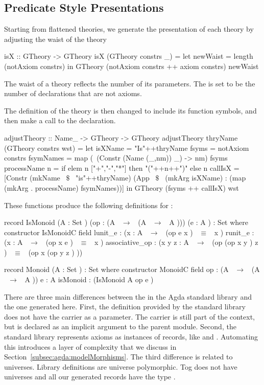 \subsection{Predicate Style Presentations}
Starting from flattened theories, we generate the  presentation of each theory by adjusting the waist of the theory
\begin{hscode}
isX :: GTheory -> GTheory
isX (GTheory constrs _) =
  let newWaist = length (notAxiom constrs) 
  in GTheory (notAxiom constrs ++ axiom constrs) newWaist
\end{hscode}
\noindent The waist of a theory reflects the number of its parameters. The  is set to be the number of declarations that are not axioms. 

The definition of the theory  is then changed to include its function symbols, and then make a call to the  declaration.  
\begin{hscode}
adjustTheory :: Name_ -> GTheory -> GTheory
adjustTheory thryName (GTheory constrs wst) =
  let isXName = "Is"++thryName
      fsyms = notAxiom constrs
      fsymNames = map (\ (Constr (Name (_,nm)) _) -> nm) fsyms
      processName n = if elem n ["+","-","*"] then "("++n++")" else n 
      callIsX = [Constr (mkName ~$\$$~ "is"++thryName)
                     (App ~$\$$~ (mkArg isXName) 
                          : (map (mkArg . processName) fsymNames))]
  in GTheory (fsyms ++ callIsX) wst 
\end{hscode} 
These functions produce the following definitions for : 
\begin{agdacode}
record IsMonoid (A  : Set ) (op  : (A  ~$\to$~ (A ~$\to$~ A ))) (e  : A ) 
                : Set where
  constructor IsMonoidC
  field
   lunit_e : ({x  : A }  ~$\to$~ (op e x ) ~$\equiv$~ x )
   runit_e : ({x  : A }  ~$\to$~ (op x e ) ~$\equiv$~ x )
   associative_op : ({x y z  : A }  ~$\to$~ 
            (op (op x y ) z ) ~$\equiv$~ (op x (op y z ) )) 

record Monoid (A  : Set )  : Set where
  constructor MonoidC
  field
   op : (A  ~$\to$~ (A  ~$\to$~ A ))
   e : A 
   isMonoid : (IsMonoid A op e ) 
\end{agdacode}
There are three main differences between the  in the Agda standard library and the one generated here. First, the definition provided by the standard library does not have the carrier as a parameter. The carrier is still part of the context, but is declared as an implicit argument to the parent module. 
Second, the standard library represents axioms as instances of records, like  and . Automating this introduces a layer of complexity that we discuss in Section~\ref{subsec:agda:modelMorphisms}. The third difference is related to universes. Library definitions are universe polymorphic. Tog does not have universes and all our generated records have the type . 

